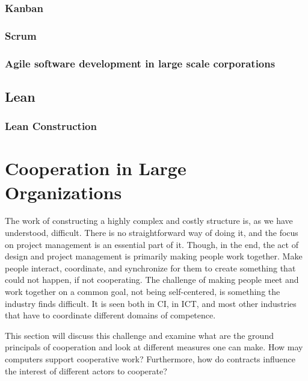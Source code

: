 \subsubsection{Kanban}
\subsubsection{Scrum} \label{sec:scrum}
\subsubsection{Agile software development in large scale corporations}
\subsection{Lean} \label{sec:lean}
\subsubsection*{Lean Construction} \label{sec:lean_construction}

\section{Cooperation in Large Organizations}
The work of constructing a highly complex and costly structure is, as we have understood, difficult. There is no straightforward way of doing it, and the focus on project management is an essential part of it. Though, in the end, the act of design and project management is primarily making people work together. Make people interact, coordinate, and synchronize for them to create something that could not happen, if not cooperating. The challenge of making people meet and work together on a common goal, not being self-centered, is something the industry finds difficult. It is seen both in CI, in ICT, and most other industries that have to coordinate different domains of competence. 

This section will discuss this challenge and examine what are the ground principals of cooperation and look at different measures one can make. How may computers support cooperative work? Furthermore, how do contracts influence the interest of different actors to cooperate? 

